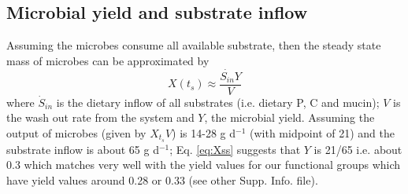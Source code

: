 \documentclass[a4paper]{article}
\begin{document}
\subsection{Microbial yield and substrate inflow}
Assuming the microbes consume all available substrate, then the steady state mass of microbes can be approximated by 
\begin{equation}
X(t_s) \approx \frac{\dot{S_{in}}Y}{V}\label{eq:Xss}
\end{equation}
where $\dot{S}_{in}$ is the dietary inflow of all substrates (i.e. dietary P, C and mucin); $V$ is the wash out rate from the system and $Y$, the microbial yield.
Assuming the output of microbes (given by $X_{t_s}V$) is 14-28 g d$^{-1}$ \citep{StephenCummings} (with midpoint of 21) and the substrate inflow is about 65 g d$^{-1}$; Eq. \ref{eq:Xss} suggests that $Y$ is 21/65 i.e. about 0.3 which matches very well with the yield values for our functional groups which have yield values around 0.28 or 0.33 (see other Supp. Info. file).
\end{document}
